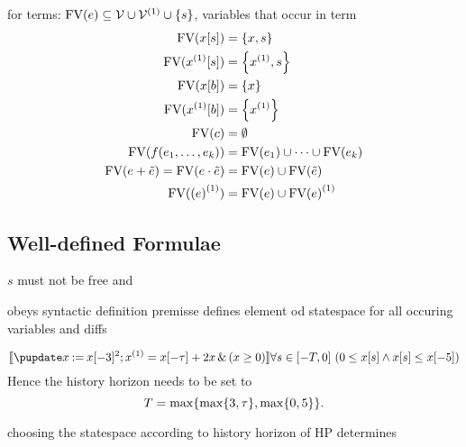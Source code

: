         \begin{definition}
            for terms: $\freevars{\astrm}\subseteq\allvars\cup\diffvars\cup\set{s}$, variables that occur in term
            \begin{align*}
                \freevars{\xtau[s]} &= \set{x,s}\\
                \freevars{\Dxtau[s]} &= \set{\D{x},s}\\
                \freevars{\xtau[b]} &= \set{x}\\
                \freevars{\Dxtau[b]} &= \set{\D{x}}\\
                \freevars{c} &= \emptyset\\
                \freevars{f(\range{\istrm{1}}{\istrm{k}})} &= \freevars{\istrm{1}} \cup\cdots\cup \freevars{\istrm{k}}\\
                \freevars{\astrm + \bstrm} = \freevars{\astrm \cdot \bstrm} &= \freevars{\astrm}\cup\freevars{\bstrm}\\
                \freevars{\D{(\astrm)}} &= \freevars{\astrm}\cup\D{\freevars{\astrm}}
            \end{align*}
                
        \end{definition}    

    \subsection{Well-defined Formulae}
        \label{sec:well-definedness}
    
        $s$ must not be free
        and

        \begin{definition}
            obeys syntactic definition
            premisse defines element od statespace for all occuring variables and diffs
        \end{definition}

        \begin{example}
            \begin{equation*}
                \dbox{\hupdate{\humod{x}{\xtau[-3]^2}};\hevolvein{\D{x}=\xtau+2x}{(x\geq 0)}}{\holdssinceclosed{T}{0\leq \xtau[s] \land \xtau[s]\leq\xtau[-5]}}
            \end{equation*}
            Hence the history horizon needs to be set to
            \begin{equation*}
                T=\max\set{\max\set{3,\tau},\max\set{0,5}}.
            \end{equation*}
        \end{example}

        \begin{lemma}
            choosing the statespace according to history horizon of HP determines
        \end{lemma}

        \begin{example}
            
        \end{example}
